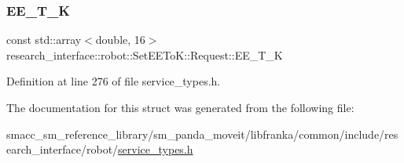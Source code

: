 \subsubsection{\texorpdfstring{E\+E\+\_\+\+T\+\_\+K}{EE\_T\_K}}
{\footnotesize\ttfamily const std\+::array$<$double, 16$>$ research\+\_\+interface\+::robot\+::\+Set\+E\+E\+To\+K\+::\+Request\+::\+E\+E\+\_\+\+T\+\_\+K}



Definition at line 276 of file service\+\_\+types.\+h.



The documentation for this struct was generated from the following file\+:\begin{DoxyCompactItemize}
\item 
smacc\+\_\+sm\+\_\+reference\+\_\+library/sm\+\_\+panda\+\_\+moveit/libfranka/common/include/research\+\_\+interface/robot/\hyperlink{service__types_8h}{service\+\_\+types.\+h}\end{DoxyCompactItemize}
